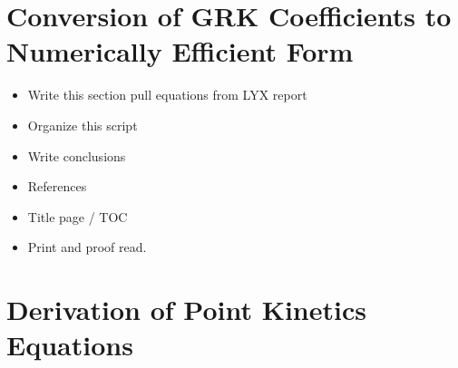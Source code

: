 \documentclass{ansconf}
\numberwithin{equation}{section}
\begin{document}
\section{Conversion of GRK Coefficients to Numerically Efficient Form}\label{app:conv}




\begin{itemize}

\item Write this section pull equations from LYX report
\item Organize this script
\item Write conclusions
\item References
\item Title page / TOC
\item Print and proof read.

\end{itemize}


\section{Derivation of Point Kinetics Equations} \label{app:pkes}
\end{document}
